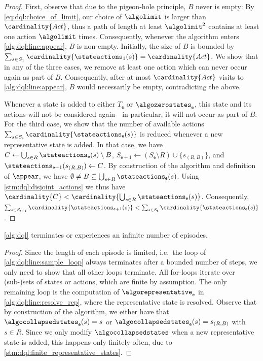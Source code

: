 \documentclass{theoretics}
\newcommand{\unionSym}{\cup}
\newcommand{\unionBin}{\mathbin{\unionSym}}
\newcommand{\UnionSym}{\bigcup}
\newcommand{\union}{\unionBin}
\newcommand{\Union}{\UnionSym}
\newcommand{\States}{S}
\newcommand{\Actions}{Act}
\newcommand{\targetset}{T}
\newcommand{\algoepisode}{\mathsf{e}}
\begin{document}
\begin{proof}
	First, observe that due to the pigeon-hole principle, $B$ never is empty:
	By \eqref{eq:dql:choice_of_limit}, our choice of $\algolimit$ is larger than $\cardinality{\Actions}$, thus a path of length at least $\algolimit^2$ contains at least one action $\algolimit$ times.
	Consequently, whenever the algorithm enters \cref{alg:dql:line:appear}, $B$ is non-empty.
	Initially, the size of $B$ is bounded by $\sum_{s \in \States_1} \cardinality{\stateactions_1(s)} = \cardinality{\Actions}$.
	We show that in any of the three cases, we remove at least one action which can never occur again as part of $B$.
	Consequently, after at most $\cardinality{\Actions}$ visits to \cref{alg:dql:line:appear}, $B$ would necessarily be empty, contradicting the above.

	Whenever a state is added to either $\targetset_\algoepisode$ or $\algozerostates_\algoepisode$, this state and its actions will not be considered again---in particular, it will not occur as part of $B$.
	For the third case, we show that the number of available actions $\sum_{s \in \States_\algoepisode} \cardinality{\stateactions_{\algoepisode}(s)}$ is reduced whenever a new representative state is added.
	In that case, we have $C \gets \Union_{s \in R} \stateactions_{\algoepisode}(s) \setminus B$, $\States_{\algoepisode + 1} \gets (\States_\algoepisode  \setminus R) \union \{s_{(R, B)}\}$, and $\stateactions_{\algoepisode + 1}(s_{(R, B)}) \gets C$.
	By construction of the algorithm and definition of $\appear$, we have $\emptyset \neq B \subseteq \Union_{s \in R} \stateactions_\algoepisode(s)$.
	Using \cref{stm:dql:disjoint_actions} we thus have $\cardinality{C} < \cardinality{\Union_{s \in R} \stateactions_\algoepisode(s)}$.
	Consequently, $\sum_{s \in \States_{\algoepisode + 1}} \cardinality{\stateactions_{\algoepisode + 1}(s)} < \sum_{s \in \States_\algoepisode} \cardinality{\stateactions_{\algoepisode}(s)}$.\end{proof}

\begin{lemma} \label{stm:dql:terminate_or_infinite_episodes}
	\cref{alg:dql} terminates or experiences an infinite number of episodes.
\end{lemma}

\begin{proof}
	Since the length of each episode is limited, i.e.\ the loop of \cref{alg:dql:line:sample_loop} always terminates after a bounded number of steps, we only need to show that all other loops terminate.
	All for-loops iterate over (sub-)sets of states or actions, which are finite by assumption.
	The only remaining loop is the computation of $\algorepresentative_\algoepisode$ in \cref{alg:dql:line:resolve_rep}, where the representative state is resolved.
	Observe that by construction of the algorithm, we either have that $\algocollapsedstates_\algoepisode(s) = s$ or $\algocollapsedstates_\algoepisode(s) = s_{(R, B)}$ with $s \in R$.
	Since we only modify $\algocollapsedstates$ when a new representative state is added, this happens only finitely often, due to \cref{stm:dql:finite_representative_states}. 
\end{proof}
\end{document}

